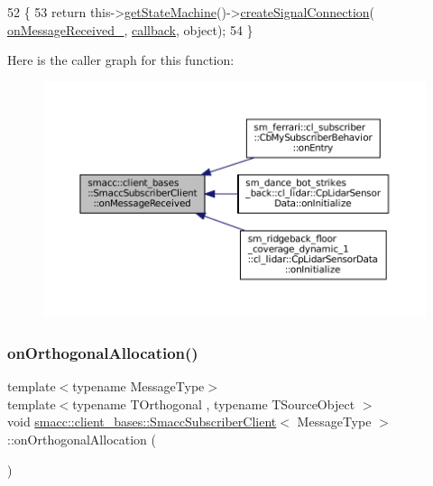 \begin{DoxyCode}
52   \{
53     \textcolor{keywordflow}{return} this->\hyperlink{classsmacc_1_1ISmaccClient_aec51d4712404cb9882b86e4c854bb93a}{getStateMachine}()->\hyperlink{classsmacc_1_1ISmaccStateMachine_adf0f42ade0c65cc471960fe2a7c42da2}{createSignalConnection}(
      \hyperlink{classsmacc_1_1client__bases_1_1SmaccSubscriberClient_a04469577ec95e2f6c04cd4dca87dfc08}{onMessageReceived\_}, \hyperlink{sm__ridgeback__barrel__search__1_2servers_2opencv__perception__node_2opencv__perception__node_8cpp_a050e697bd654facce10ea3f6549669b3}{callback}, \textcolor{keywordtype}{object});
54   \}
\end{DoxyCode}
Here is the caller graph for this function\+:
\nopagebreak
\begin{figure}[H]
\begin{center}
\leavevmode
\includegraphics[width=350pt]{classsmacc_1_1client__bases_1_1SmaccSubscriberClient_a4f02251e3a161fb6d802b154b1081f18_icgraph}
\end{center}
\end{figure}
\mbox{\label{classsmacc_1_1client__bases_1_1SmaccSubscriberClient_a8843bd148887523698b6d01dae740a97}} 
\subsubsection{\texorpdfstring{on\+Orthogonal\+Allocation()}{onOrthogonalAllocation()}}
{\footnotesize\ttfamily template$<$typename Message\+Type$>$ \\
template$<$typename T\+Orthogonal , typename T\+Source\+Object $>$ \\
void \hyperlink{classsmacc_1_1client__bases_1_1SmaccSubscriberClient}{smacc\+::client\+\_\+bases\+::\+Smacc\+Subscriber\+Client}$<$ Message\+Type $>$\+::on\+Orthogonal\+Allocation (\begin{DoxyParamCaption}{ }\end{DoxyParamCaption})\hspace{0.3cm}{\ttfamily [inline]}}



